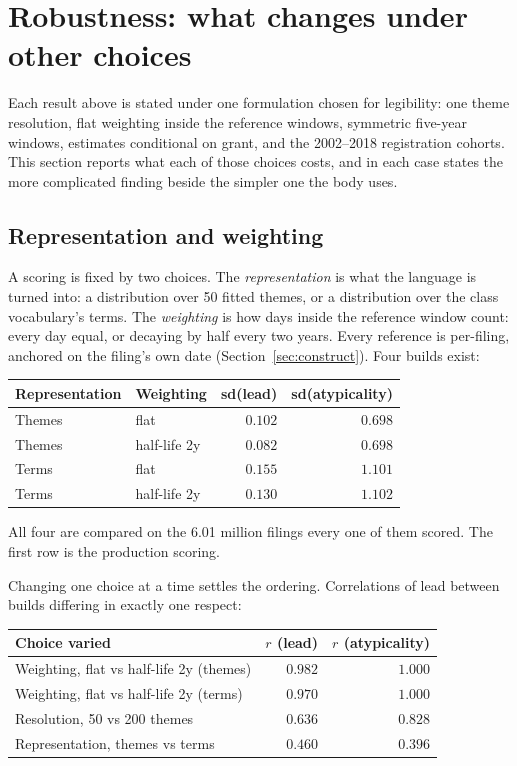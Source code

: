 \section{Robustness: what changes under other choices}\label{sec:robust}

Each result above is stated under one formulation chosen for legibility: one
theme resolution, flat weighting inside the reference windows, symmetric
five-year windows, estimates conditional on grant, and the 2002--2018
registration cohorts. This section reports what each of those choices costs,
and in each case states the more complicated finding beside the simpler one
the body uses.

\subsection{Representation and weighting}

A scoring is fixed by two choices. The \emph{representation} is what the
language is turned into: a distribution over 50 fitted themes, or a
distribution over the class vocabulary's terms. The \emph{weighting} is
how days inside the reference window count: every day equal, or decaying
by half every two years. Every reference is per-filing, anchored on the
filing's own date (Section~\ref{sec:construct}). Four builds exist:

\begin{center}\small
\begin{tabular}{llrr}
\toprule
Representation & Weighting & sd(lead) & sd(atypicality) \\
\midrule
Themes & flat          & $0.102$ & $0.698$ \\
Themes & half-life 2y  & $0.082$ & $0.698$ \\
Terms  & flat          & $0.155$ & $1.101$ \\
Terms  & half-life 2y  & $0.130$ & $1.102$ \\
\bottomrule
\end{tabular}
\end{center}

\noindent All four are compared on the 6.01 million filings every one of
them scored. The first row is the production scoring.

Changing one choice at a time settles the ordering. Correlations of lead
between builds differing in exactly one respect:

\begin{center}\small
\begin{tabular}{lrr}
\toprule
Choice varied & $r$ (lead) & $r$ (atypicality) \\
\midrule
Weighting, flat vs half-life 2y (themes)  & $0.982$ & $1.000$ \\
Weighting, flat vs half-life 2y (terms)   & $0.970$ & $1.000$ \\
Resolution, 50 vs 200 themes\footnotemark              & $0.636$ & $0.828$ \\
Representation, themes vs terms           & $0.460$ & $0.396$ \\
\bottomrule
\end{tabular}
\end{center}

